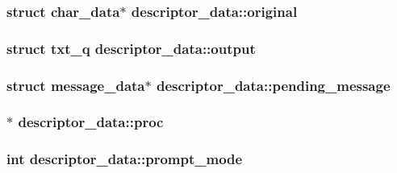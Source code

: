 \hypertarget{structdescriptor__data_a674989dd9cb36800482736346ab0194b}{
\subsubsection[{original}]{\setlength{\rightskip}{0pt plus 5cm}struct {\bf char\-\_\-data}$\ast$ descriptor\-\_\-data\-::original}}\label{structdescriptor__data_a674989dd9cb36800482736346ab0194b}
\hypertarget{structdescriptor__data_a5042f5dc6da8bbd09295264fb22a4133}{
\subsubsection[{output}]{\setlength{\rightskip}{0pt plus 5cm}struct {\bf txt\-\_\-q} descriptor\-\_\-data\-::output}}\label{structdescriptor__data_a5042f5dc6da8bbd09295264fb22a4133}
\hypertarget{structdescriptor__data_a8de6ed1bad23a2b053cd6c81e6e2d1aa}{
\subsubsection[{pending\-\_\-message}]{\setlength{\rightskip}{0pt plus 5cm}struct {\bf message\-\_\-data}$\ast$ descriptor\-\_\-data\-::pending\-\_\-message}}\label{structdescriptor__data_a8de6ed1bad23a2b053cd6c81e6e2d1aa}
\hypertarget{structdescriptor__data_a92022a077164d074621347c9ffd65512}{
\subsubsection[{proc}]{$\ast$ descriptor\-\_\-data\-::proc}}\label{structdescriptor__data_a92022a077164d074621347c9ffd65512}
\hypertarget{structdescriptor__data_aaf489b5a2c14b23cae51b91c5561ccd8}{
\subsubsection[{prompt\-\_\-mode}]{\setlength{\rightskip}{0pt plus 5cm}int descriptor\-\_\-data\-::prompt\-\_\-mode}}\label{structdescriptor__data_aaf489b5a2c14b23cae51b91c5561ccd8}
